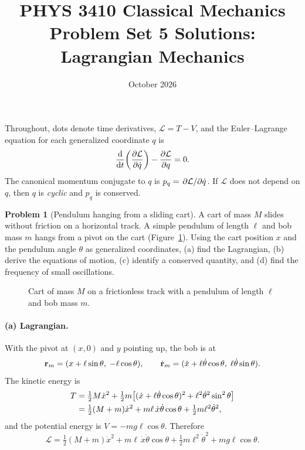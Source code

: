 \documentclass[11pt]{article}
\title{PHYS 3410 Classical Mechanics\\[2pt] \large Problem Set 5 Solutions: Lagrangian Mechanics}
\author{}
\date{October 2026}
\theoremstyle{definition}
\newtheorem{problem}{Problem}
\newcommand{\Lag}{\mathcal{L}}
\begin{document}
\maketitle

\noindent Throughout, dots denote time derivatives, $\Lag = T - V$, and the Euler--Lagrange equation for each generalized coordinate $q$ is
\begin{equation}
  \dv{t}\qty(\pdv{\Lag}{\dot q}) - \pdv{\Lag}{q} = 0.
  \label{eq:EL}
\end{equation}
The canonical momentum conjugate to $q$ is $p_q = \pdv*{\Lag}{\dot q}$. If $\Lag$ does not depend on $q$, then $q$ is \emph{cyclic} and $p_q$ is conserved.

\begin{problem}[Pendulum hanging from a sliding cart]\label{prob:cart}
A cart of mass $M$ slides without friction on a horizontal track. A simple pendulum of length $\ell$ and bob mass $m$ hangs from a pivot on the cart (Figure~\ref{fig:cart}). Using the cart position $x$ and the pendulum angle $\theta$ as generalized coordinates, (a) find the Lagrangian, (b) derive the equations of motion, (c) identify a conserved quantity, and (d) find the frequency of small oscillations.
\end{problem}

\begin{figure}[ht]
  \centering
  
  \caption{Cart of mass $M$ on a frictionless track with a pendulum of length $\ell$ and bob mass $m$.}
  \label{fig:cart}
\end{figure}

\paragraph{(a) Lagrangian.} With the pivot at $(x, 0)$ and $y$ pointing up, the bob is at
\[
  \vb{r}_m = (x + \ell\sin\theta,\; -\ell\cos\theta),
  \qquad
  \dot{\vb{r}}_m = (\dot x + \ell\dot\theta\cos\theta,\; \ell\dot\theta\sin\theta).
\]
The kinetic energy is
\begin{align}
  T &= \tfrac12 M\dot x^2 + \tfrac12 m\qty[(\dot x + \ell\dot\theta\cos\theta)^2 + \ell^2\dot\theta^2\sin^2\theta] \notag \\
    &= \tfrac12 (M + m)\dot x^2 + m\ell\,\dot x\dot\theta\cos\theta + \tfrac12 m\ell^2\dot\theta^2,
\end{align}
and the potential energy is $V = -mg\ell\cos\theta$. Therefore
\begin{equation}
  \Lag = \tfrac12 (M + m)\dot x^2 + m\ell\,\dot x\dot\theta\cos\theta + \tfrac12 m\ell^2\dot\theta^2 + mg\ell\cos\theta.
  \label{eq:cart-L}
\end{equation}
\end{document}
